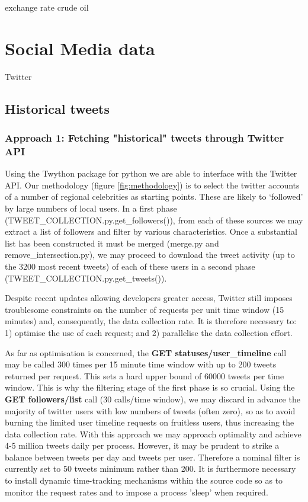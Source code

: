 exchange rate
crude oil


\section*{Social Media data}
Twitter

\subsection*{Historical tweets}

\subsubsection*{Approach 1: Fetching "historical" tweets through Twitter API}

Using the Twython package for python we are able to interface with the Twitter API. Our methodology (figure \ref{fig:methodology}) is to select the twitter accounts of a number of regional celebrities as starting points. These are likely to `followed' by large numbers of local users. In a first phase (TWEET\_COLLECTION.py.get\_followers()), from each of these sources we may extract a list of followers and filter by various characteristics. Once a substantial list has been constructed it must be merged (merge.py and remove\_intersection.py), we may proceed to download the tweet activity (up to the 3200 most recent tweets) of each of these users in a second phase (TWEET\_COLLECTION.py.get\_tweets()).

Despite recent updates allowing developers greater access, Twitter still imposes troublesome constraints on the number of requests per unit time window (15 minutes) and, consequently, the data collection rate. It is therefore necessary to: 1) optimise the use of each request; and 2) parallelise the data collection effort.

As far as optimisation is concerned, the \textbf{GET statuses/user\_timeline} call may be called 300 times per 15 minute time window with up to 200 tweets returned per request. This sets a hard upper bound of 60000 tweets per time window. This is why the filtering stage of the first phase is so crucial. Using the \textbf{GET followers/list} call (30 calls/time window), we may discard in advance the majority of twitter users with low numbers of tweets (often zero), so as to avoid burning the limited user timeline requests on fruitless users, thus increasing the data collection rate. With this approach we may approach optimality and achieve 4-5 million tweets daily per process. However, it may be prudent to strike a balance between tweets per day and tweets per user. Therefore a nominal filter is currently set to 50 tweets minimum rather than 200. It is furthermore necessary to install dynamic time-tracking mechanisms within the source code so as to monitor the request rates and to impose a process 'sleep' when required.

